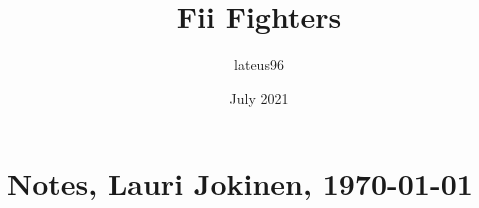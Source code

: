 \documentclass[a5paper,12pt]{article}
\title{Fii Fighters}
\author{lateus96 }
\date{July 2021}
\begin{document}
\sloppy

\section{Notes, Lauri Jokinen, \today}

\tableofcontents


\end{document}
